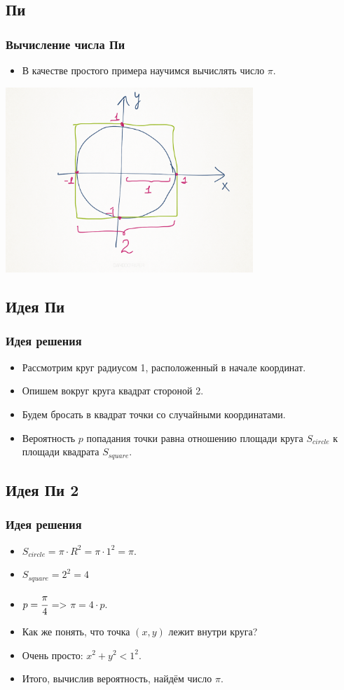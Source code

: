\documentclass[compress,red]{beamer}
\begin{document}
\subsection{Пи}
\begin{frame}[fragile]
  \frametitle{Вычисление числа Пи}
  \begin{itemize}
    \item В качестве простого примера научимся вычислять число $\pi$.
  \end{itemize}
  \centerline{\includegraphics[width=0.7\textwidth]{images/pi-monte-carlo.png}}
\end{frame}

\subsection{Идея Пи}
\begin{frame}[fragile]
  \frametitle{Идея решения}
  \begin{itemize}
    \item Рассмотрим круг радиусом 1, расположенный в начале координат.
    \item Опишем вокруг круга квадрат стороной 2.
    \item Будем бросать в квадрат точки со случайными координатами.
    \item Вероятность $p$ попадания точки равна отношению площади круга $S_{circle}$ к площади квадрата $S_{square}$.
  \end{itemize}
\end{frame}

\subsection{Идея Пи 2}
\begin{frame}[fragile]
  \frametitle{Идея решения}
  \begin{itemize}
    \item $S_{circle} = \pi\cdot R^2 = \pi\cdot 1^2 = \pi$.
    \item $S_{square} = 2^2 = 4$
    \item $p = \cfrac{\pi}{4}$ => $\pi = 4\cdot p$.
    \item Как же понять, что точка $(x,y)$ лежит внутри круга? 
    \item Очень просто: $x^2 + y^2 < 1^2$.
    \item Итого, вычислив вероятность, найдём число $\pi$.
  \end{itemize}
\end{frame}
\end{document}
